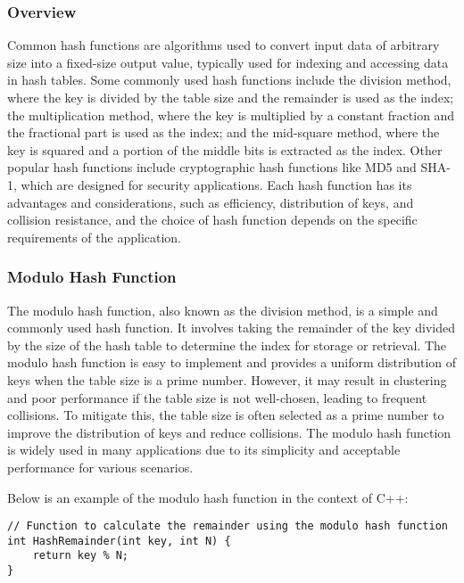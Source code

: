 \subsubsection{Overview}

Common hash functions are algorithms used to convert input data of arbitrary size into a fixed-size output value, typically used for indexing and accessing data in hash tables. Some commonly used hash functions 
include the division method, where the key is divided by the table size and the remainder is used as the index; the multiplication method, where the key is multiplied by a constant fraction and the fractional 
part is used as the index; and the mid-square method, where the key is squared and a portion of the middle bits is extracted as the index. Other popular hash functions include cryptographic hash functions like 
MD5 and SHA-1, which are designed for security applications. Each hash function has its advantages and considerations, such as efficiency, distribution of keys, and collision resistance, and the choice of hash 
function depends on the specific requirements of the application.

\subsubsection{Modulo Hash Function}

The modulo hash function, also known as the division method, is a simple and commonly used hash function. It involves taking the remainder of the key divided by the size of the hash table to determine the index 
for storage or retrieval. The modulo hash function is easy to implement and provides a uniform distribution of keys when the table size is a prime number. However, it may result in clustering and poor performance 
if the table size is not well-chosen, leading to frequent collisions. To mitigate this, the table size is often selected as a prime number to improve the distribution of keys and reduce collisions. The modulo hash 
function is widely used in many applications due to its simplicity and acceptable performance for various scenarios.

\begin{solution}

Below is an example of the modulo hash function in the context of C++:

\horizontalline

\begin{verbatim}
// Function to calculate the remainder using the modulo hash function
int HashRemainder(int key, int N) {
    return key % N;
}
\end{verbatim}

\horizontalline
    
\end{solution}

